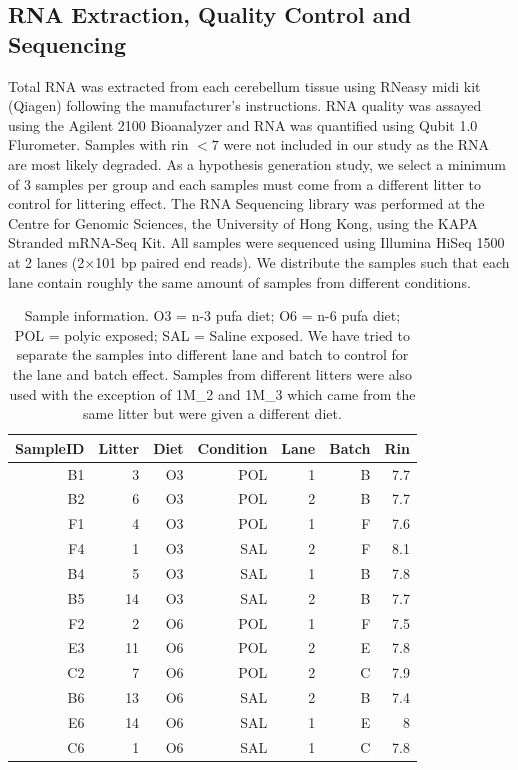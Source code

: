 \subsection{RNA Extraction, Quality Control and Sequencing}
Total RNA was extracted from each cerebellum tissue using RNeasy midi kit (Qiagen) following the manufacturer's instructions.
RNA quality was assayed using the Agilent 2100 Bioanalyzer and RNA was quantified using Qubit 1.0 Flurometer.
Samples with \gls{rin} $<7$ were not included in our study as the RNA are most likely degraded.
As a hypothesis generation study, we select a minimum of 3 samples per group and each samples must come from a different litter to control for littering effect.
The RNA Sequencing library was performed at the Centre for Genomic Sciences, the University of Hong Kong, using the KAPA Stranded mRNA-Seq Kit. 
All samples were sequenced using Illumina HiSeq 1500 at 2 lanes (2$\times$101 \gls{bp} paired end reads).
We distribute the samples such that each lane contain roughly the same amount of samples from different conditions.
\begin{table}
	\centering
	\begin{tabular}{rrrrrrr}
		\toprule
		SampleID & Litter & Diet & Condition & Lane & Batch & Rin\\
		\midrule
		B1&	3&	O3&	POL&	1&	B&	7.7\\
		B2&	6&	O3&	POL&	2&	B&	7.7\\
		F1&	4&	O3&	POL&	1&	F&	7.6\\
		F4&	1&	O3&	SAL&	2&	F&	8.1\\
		B4&	5&	O3&	SAL&	1&	B&	7.8\\
		B5&	14&	O3&	SAL&	2&	B&	7.7\\
		F2&	2&	O6&	POL&	1&	F&	7.5\\
		E3&	11&	O6&	POL&	2&	E&	7.8\\
		C2&	7&	O6&	POL&	2&	C&	7.9\\
		B6&	13&	O6&	SAL&	2&	B&	7.4\\
		E6&	14&	O6&	SAL&	1&	E&	8\\
		C6&	1&	O6&	SAL&	1&	C&	7.8\\
		\bottomrule
	\end{tabular}
	\caption[Sample Information]{
		Sample information.
		O3 = n-3 \gls{pufa} diet; O6 = n-6 \gls{pufa} diet; POL = \gls{polyic} exposed; SAL = Saline exposed.
		We have tried to separate the samples into different lane and batch to control for the lane and batch effect. 
		Samples from different litters were also used with the exception of 1M\_2 and 1M\_3 which came from the same litter but were given a different diet.
		\label{tab:sampleInfo}
	}
\end{table}
